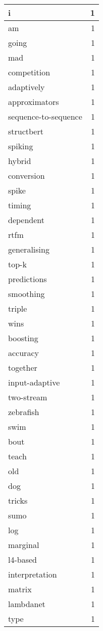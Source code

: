 \begin{table}[h]
\begin{tabular}{|l|r|}
\hline
i & 1 \\
\hline
am & 1 \\
\hline
going & 1 \\
\hline
mad & 1 \\
\hline
competition & 1 \\
\hline
adaptively & 1 \\
\hline
approximators & 1 \\
\hline
sequence-to-sequence & 1 \\
\hline
structbert & 1 \\
\hline
spiking & 1 \\
\hline
hybrid & 1 \\
\hline
conversion & 1 \\
\hline
spike & 1 \\
\hline
timing & 1 \\
\hline
dependent & 1 \\
\hline
rtfm & 1 \\
\hline
generalising & 1 \\
\hline
top-k & 1 \\
\hline
predictions & 1 \\
\hline
smoothing & 1 \\
\hline
triple & 1 \\
\hline
wins & 1 \\
\hline
boosting & 1 \\
\hline
accuracy & 1 \\
\hline
together & 1 \\
\hline
input-adaptive & 1 \\
\hline
two-stream & 1 \\
\hline
zebrafish & 1 \\
\hline
swim & 1 \\
\hline
bout & 1 \\
\hline
teach & 1 \\
\hline
old & 1 \\
\hline
dog & 1 \\
\hline
tricks & 1 \\
\hline
sumo & 1 \\
\hline
log & 1 \\
\hline
marginal & 1 \\
\hline
l4-based & 1 \\
\hline
interpretation & 1 \\
\hline
matrix & 1 \\
\hline
lambdanet & 1 \\
\hline
type & 1 \\

\end{tabular}
\end{table}
